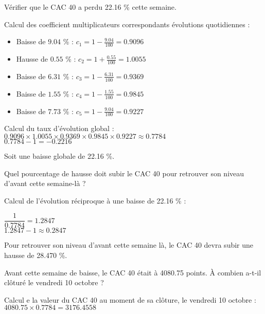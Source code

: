 \begin{questions}

	\question Vérifier que le CAC 40 a perdu \num{22.16} \% cette semaine.
		\begin{solution}
			Calcul des coefficient multiplicateurs correspondants évolutions quotidiennes :
			\begin{itemize}
				\item Baisse de $\num{9.04}$ \% : $c_1 = 1 - \frac{\num{9.04}}{100} = \num{0.9096 } $ 
				\item Hausse de $\num{0.55}$ \% : $c_2 = 1 + \frac{\num{0.55}}{100} = \num{1.0055 }$ 
				\item Baisse de $\num{6.31}$ \% : $c_3 = 1 - \frac{\num{6.31}}{100} = \num{0.9369 }$ 
				\item Baisse de $\num{1.55}$ \% : $c_4 = 1 - \frac{\num{1.55}}{100} = \num{0.9845 }$ 
				\item Baisse de $\num{7.73}$ \% : $c_5 = 1 - \frac{\num{9.04}}{100} = \num{0.9227 }$ 
			\end{itemize}
		
	
			Calcul du taux d'évolution global :
			$ \num{0.9096 } \times \num{1.0055 } \times \num{0.9369 } \times \num{0.9845 } \times \num{0.9227 } \approx \num{0.7784}$ \\
			
			$ \num{0.7784} - 1 = - \num{0.2216}$
			
			Soit une baisse globale de \num{22.16} \%.
		\end{solution}
	
	\question Quel pourcentage de hausse doit subir le CAC 40 pour retrouver son niveau d'avant cette semaine-là ?
		\begin{solution}
			Calcul de l'évolution réciproque à une baisse de \num{22.16} \% :
			
			$\dfrac{1}{\num{0.7784}} = \num{1.2847}$\\
			
			$ \num{1.2847} - 1 \approx \num{0.2847}$
			
			Pour retrouver son niveau d'avant cette semaine là, le CAC 40 devra subir une hausse de \num{28.470} \%.
		\end{solution}
	
	\question Avant cette semaine de baisse, le CAC 40 était à \num{4080.75} points. \`A combien a-t-il clôturé le vendredi 10 octobre ?
		\begin{solution}
			
			Calcul e la valeur du CAC 40 au moment de sa clôture, le vendredi 10 octobre : 
			$\num{4080.75} \times \num{0.7784} = \num{3176.4558}$
			

\end{solution}
\end{questions}
